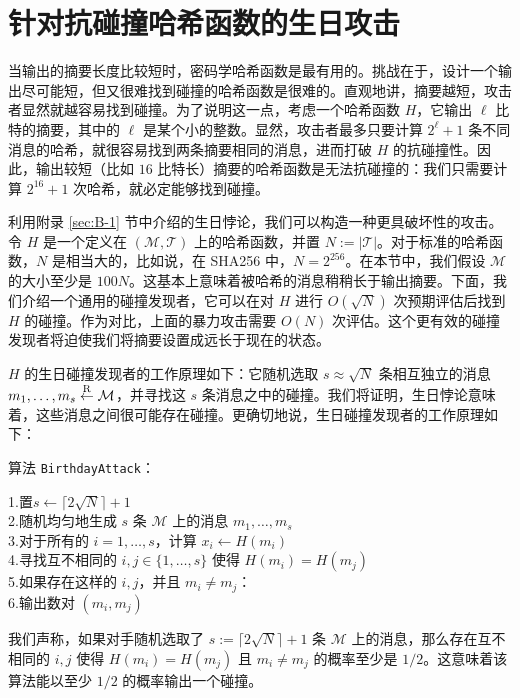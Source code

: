 \section{针对抗碰撞哈希函数的生日攻击}\label{sec:8-3}

当输出的摘要长度比较短时，密码学哈希函数是最有用的。挑战在于，设计一个输出尽可能短，但又很难找到碰撞的哈希函数是很难的。直观地讲，摘要越短，攻击者显然就越容易找到碰撞。为了说明这一点，考虑一个哈希函数 $H$，它输出 $\ell$ 比特的摘要，其中的 $\ell$ 是某个小的整数。显然，攻击者最多只要计算 $2^\ell+1$ 条不同消息的哈希，就很容易找到两条摘要相同的消息，进而打破 $H$ 的抗碰撞性。因此，输出较短（比如 $16$ 比特长）摘要的哈希函数是无法抗碰撞的：我们只需要计算 $2^{16}+1$ 次哈希，就必定能够找到碰撞。

\begin{snote}[生日攻击。]
利用附录 \ref{sec:B-1} 节中介绍的生日悖论，我们可以构造一种更具破坏性的攻击。令 $H$ 是一个定义在 $(\mathcal{M},\mathcal{T})$ 上的哈希函数，并置 $N:=|\mathcal{T}|$。对于标准的哈希函数，$N$ 是相当大的，比如说，在 SHA256 中，$N=2^{256}$。在本节中，我们假设 $\mathcal{M}$ 的大小至少是 $100N$。这基本上意味着被哈希的消息稍稍长于输出摘要。下面，我们介绍一个通用的碰撞发现者，它可以在对 $H$ 进行 $O(\sqrt{N})$ 次预期评估后找到 $H$ 的碰撞。作为对比，上面的暴力攻击需要 $O(N)$ 次评估。这个更有效的碰撞发现者将迫使我们将摘要设置成远长于现在的状态。

$H$ 的生日碰撞发现者的工作原理如下：它随机选取 $s\approx\sqrt{N}$ 条相互独立的消息 $m_1,\dots,m_s\overset{\rm R}\leftarrow\mathcal{M}$，并寻找这 $s$ 条消息之中的碰撞。我们将证明，生日悖论意味着，这些消息之间很可能存在碰撞。更确切地说，生日碰撞发现者的工作原理如下：

\vspace{5pt}

\hspace*{5pt}算法 \texttt{BirthdayAttack}：

\vspace{5pt}

\hspace*{28.5pt} 1.\quad 置$s\leftarrow\lceil 2\sqrt{N}\rceil+1$\\
\hspace*{50pt} 2.\quad 随机均匀地生成 $s$ 条 $\mathcal{M}$ 上的消息 $m_1,\dots,m_s$\\
\hspace*{50pt} 3.\quad 对于所有的 $i=1,\dots,s$，计算 $x_i\leftarrow H(m_i)$\\
\hspace*{50pt} 4.\quad 寻找互不相同的 $i,j\in\{1,\dots,s\}$ 使得 $H(m_i)=H(m_j)$\\
\hspace*{50pt} 5.\quad 如果存在这样的 $i,j$，并且 $m_i\neq m_j$：\\
\hspace*{50pt} 6.\quad\quad\quad 输出数对 $(m_i,m_j)$

\vspace{5pt}

\noindent
我们声称，如果对手随机选取了 $s:=\lceil 2\sqrt{N}\rceil+1$ 条 $\mathcal{M}$ 上的消息，那么存在互不相同的 $i,j$ 使得 $H(m_i)=H(m_j)$ 且 $m_i\neq m_j$ 的概率至少是 $1/2$。这意味着该算法能以至少 $1/2$ 的概率输出一个碰撞。
\end{snote}

